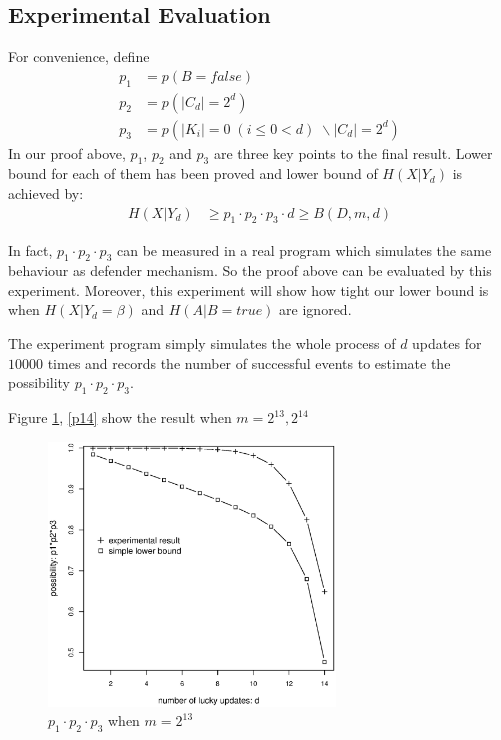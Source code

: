 \documentclass[10pt, conference, compsocconf]{IEEEtran}
\begin{document}
    \subsection{Experimental Evaluation}
        For convenience, define
        \begin{align*}
         p_1 &= p(B = false)\\
         p_2 &= p(|C_d| = 2^d)\\
         p_3 &= p(|K_i| = 0 \; (i \leq 0 < d) \; \backslash |C_d| = 2^d)
        \end{align*}
        In our proof above, $p_1$,
        $p_2$ and $p_3$ are
        three key points to the final result.
        Lower bound for each of them has been proved
        and lower bound of $H(X | Y_d)$ is achieved by:
        \begin{align*}
            H(X | Y_d) &\geq p_1 \cdot p_2 \cdot p_3 \cdot d
                \geq B(D, m, d)
        \end{align*}

        In fact, $p_1 \cdot p_2 \cdot p_3$ can be measured in a real program which
        simulates the same behaviour as defender mechanism.
        So the proof above can be evaluated by this experiment.
        Moreover, this experiment will show how tight our lower bound is
        when $H(X | Y_d = \beta)$ and $H(A | B = true)$ are ignored.

        The experiment program simply simulates the whole process of $d$ updates
        for $10000$ times and records the number of successful events
        to estimate the possibility $p_1 \cdot p_2 \cdot p_3$.

        Figure \ref{p13}, \ref{p14} show the result when $m = 2^{13}, 2^{14}$

        \begin{figure}[!t]
        \centering
        \includegraphics[width=3in, trim=0mm 0mm 0mm 20mm]{p13.eps}
        \caption{$p_1 \cdot p_2 \cdot p_3$ when $m = 2^{13}$}\label{p13}
        \end{figure}
\end{document}

